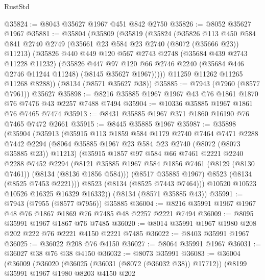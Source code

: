\begin{lexlean}{RustStd}
\begin{coremodule}
{\begin{coremodule}
{{{{{{{{{{{{{{{{{{{{{{{{{{{{{{{{{{{{{{{{{{{{{{{{{{{{{@35824 := @8043 @35627 @1967 @451 @842 @2750
@35826 := @8052 @35627 @1967
@35881 := @35804
    (@35809
      (@35819
        (@35824
          (@35826
            @113
            @450
            @584
            @841
            @2740
            @2749
            (@35661 @23 @584 @23 @2740 (@8072 (@35666 @23)) @11213)
            (@35826
              @440
              @449
              @120
              @567
              @2743
              @2748
              (@35684 @439 @2743 @11228 @11232)
              (@35826
                @447
                @97
                @120
                @66
                @2746
                @2240
                (@35684 @446 @2746 @11244 @11248)
                (@8145 @35627 @1967)))))
        @11259
        @11262
        @11265
        @11268
        @8288))
    (@8134 (@8571 @35627 @38))
@35885 := @7943 (@7960 (@8577 @7961)) @35627
@35898 := @8216 @35885 @1967 @1967 @43 @76 @1861 @1870 @76 @7476 @43 @2257 @7488 @7494
@35904 := @10336 @35885 @1967 @1861 @76 @7465 @7474
@35913 := @8431 @35885 @1967 @371 @1860 @16190 @76 @7465 @7472 @2661
@35915 := @8445 @35885 @1967
@35987 := @35898
    (@35904
      (@35913
        (@35915
          @113
          @1859
          @584
          @1179
          @2740
          @7464
          @7471
          @2288
          @7442
          @2294
          (@8064 @35885 @1967 @23 @584 @23 @2740 (@8072 (@8073 @35885 @23)) @11213)
          (@35915
            @1857
            @97
            @584
            @66
            @7461
            @2221
            @2240
            @2288
            @7452
            @2294
            (@8121 @35885 @1967 @584 @1856 @7461 (@8129 (@8130 @7461)) (@8134 (@8136 @1856 @584)))
            (@8517 @35885 @1967)
            @8523
            (@8134 (@8525 @7453 @2221)))
          @8523
          (@8134 (@8525 @7443 @7464)))
        @10520
        @10523
        @10526
        @16325
        @16329
        @16332))
    (@8134 (@8571 @35885 @43))
@35991 := @7943 (@7955 (@8577 @7956)) @35885
@36004 := @8216 @35991 @1967 @1967 @48 @76 @1867 @1869 @76 @7485 @48 @2257 @2221 @7494
@36009 := @8095 @35991 @1967 @1867 @76 @7485
@36020 := @8014 @35991 @1967 @1980 @208 @202 @222 @76 @2221 @4150 @2221 @7485
@36022 := @8403 @35991 @1967
@36025 := @36022 @208 @76 @4150
@36027 := @8064 @35991 @1967
@36031 := @36027 @38 @76 @38 @4150
@36032 := @8073 @35991
@36083 := @36004
    (@36009
      (@36020
        (@36025 (@36031 (@8072 (@36032 @38)) @17712))
        (@8199
          @35991
          @1967
          @1980
          @8203
          @4150
          @202
}}}}}}}}}}}}}}}}}}}}}}}}}}}}}}}}}}}}}}}}}}}}}}}}}}}}}
\end{coremodule}}
\end{coremodule}
\end{lexlean}
